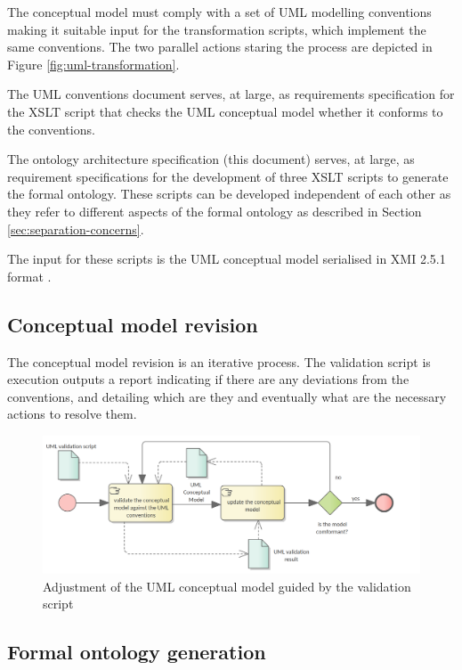 	The conceptual model must comply with a set of UML modelling conventions making it suitable input for the transformation scripts, which implement the same conventions. The two parallel actions staring the process are depicted in Figure \ref{fig:uml-transformation}.
		
	The UML conventions document serves, at large, as requirements specification for the XSLT script that checks the UML conceptual model  whether it conforms to the conventions.
	
	The ontology architecture specification (this document) serves, at large, as requirement specifications for the development of three XSLT scripts to generate the formal ontology. These scripts can be developed independent of each other as they refer to different aspects of the formal ontology as described in Section \ref{sec:separation-concerns}.
	
	The input for these scripts is the UML conceptual model serialised in XMI 2.5.1 format \cite{xmi2.5.1}.
	
	\subsection{Conceptual model revision}
	\label{sec:revision-cm}
	
	The conceptual model revision is an iterative process. The validation script is execution outputs a report indicating if there are any deviations from the conventions, and detailing which are they and eventually what are the necessary actions to resolve them. 
	
	\begin{figure}[!ht]	
		\centering
		\includegraphics[width=.85\textwidth]{../img/conceptualModelRevision.png}
		\caption{Adjustment of the UML conceptual model guided by the validation script}
		\label{fig:revision-cm}
	\end{figure}
	
	\subsection{Formal ontology generation}
	\label{sec:ontology-generation}
	
